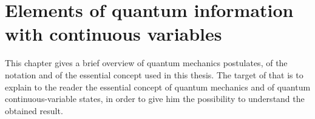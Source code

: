 \chapter[Continuous Variables States]{Elements of quantum information with continuous variables}
    This chapter gives a brief overview of quantum mechanics postulates,
    of the notation and of the essential concept used in this thesis. 
    The target of that is to explain to the reader the essential concept of quantum mechanics
    and of quantum continuous-variable states, in 
    order to give him the possibility to understand the obtained result.

    



    
    
    

    

